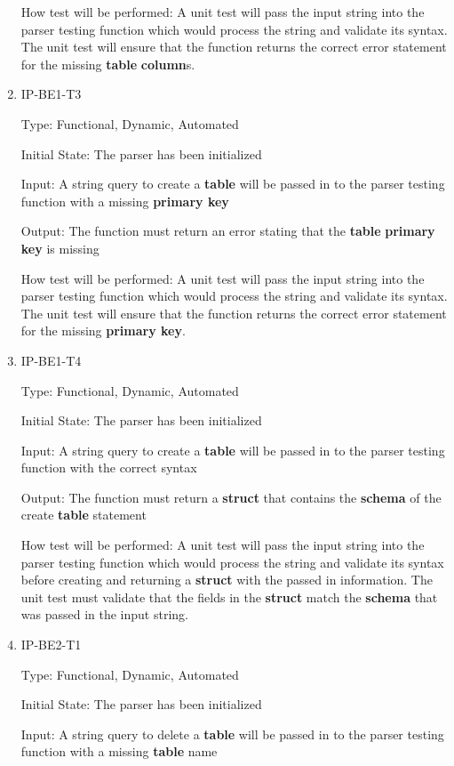 \documentclass[12pt, titlepage]{article}
\begin{document}
\begin{enumerate}
How test will be performed: A unit test will pass the input string into the parser testing function which would process the string and validate its syntax. The unit test will ensure that the function returns the correct error statement for the missing \textbf{table} \textbf{column}s.

\item{IP-BE1-T3}

Type: Functional, Dynamic, Automated
					
Initial State: The parser has been initialized
					
Input: A string query to create a \textbf{table} will be passed in to the parser testing function with a missing \textbf{primary key}
					
Output: The function must return an error stating that the \textbf{table} \textbf{primary key} is missing
					
How test will be performed: A unit test will pass the input string into the parser testing function which would process the string and validate its syntax. The unit test will ensure that the function returns the correct error statement for the missing \textbf{primary key}.

\item{IP-BE1-T4}

Type: Functional, Dynamic, Automated
					
Initial State: The parser has been initialized
					
Input: A string query to create a \textbf{table} will be passed in to the parser testing function with the correct syntax
					
Output: The function must return a \textbf{struct} that contains the \textbf{schema} of the create \textbf{table} statement
					
How test will be performed: A unit test will pass the input string into the parser testing function which would process the string and validate its syntax before creating and returning a \textbf{struct} with the passed in information. The unit test must validate that the fields in the \textbf{struct} match the \textbf{schema} that was passed in the input string.

\item{IP-BE2-T1}

Type: Functional, Dynamic, Automated
					
Initial State: The parser has been initialized
					
Input: A string query to delete a \textbf{table} will be passed in to the parser testing function with a missing \textbf{table} name
					

\end{enumerate}
\end{document}
